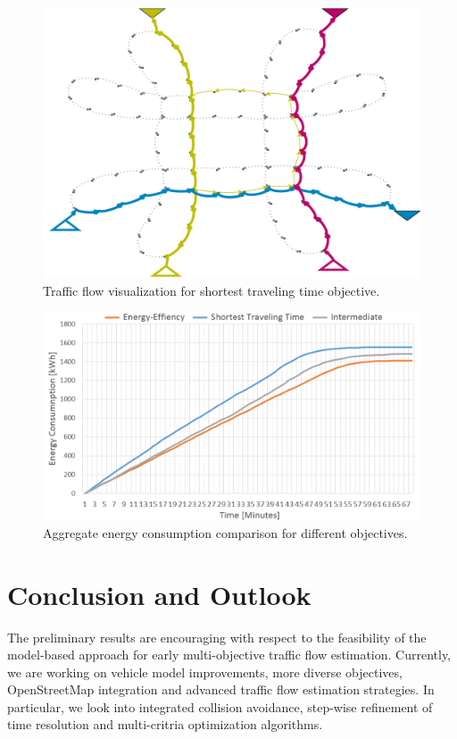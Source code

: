 \documentclass[conference]{../cls/IEEEtran}
\begin{document}
\begin{figure}[t!]
	\centering
	\includegraphics[width=0.925\columnwidth]{../gfx/graph2.png}
	\caption{Traffic flow visualization for shortest traveling time objective.}
	\label{figure:graph}
\end{figure}

\begin{figure}[t!]
	\centering
	\includegraphics[width=0.925\columnwidth]{../gfx/chart2.png}
	\caption{Aggregate energy consumption comparison for different objectives.}
	\label{figure:chart}
\end{figure}

\section{Conclusion and Outlook}

The preliminary results are encouraging with respect to the feasibility of the
model-based approach for early multi-objective traffic flow estimation.
Currently, we are working on vehicle model
improvements, more diverse objectives, OpenStreetMap integration and advanced 
traffic flow estimation strategies. In particular, we look into integrated
collision avoidance, step-wise refinement of time resolution and multi-critria
optimization algorithms.




\end{document}
